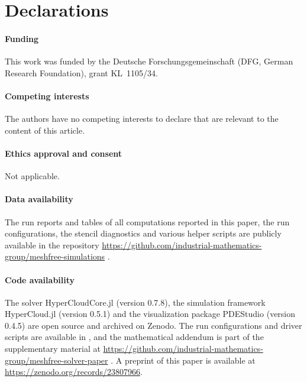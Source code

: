 \documentclass[smallextended]{svjour3}
\numberwithin{equation}{section}
\begin{document}
\section*{Declarations}

\paragraph{Funding}
This work was funded by the Deutsche Forschungsgemeinschaft (DFG, German Research Foundation), grant KL~1105/34.

\paragraph{Competing interests}
The authors have no competing interests to declare that are relevant to the content of this article.

\paragraph{Ethics approval and consent}
Not applicable.

\paragraph{Data availability}
\begin{sloppypar}%
The run reports and tables of all computations reported in this paper, the run configurations, the stencil diagnostics and various helper scripts are publicly available in the repository \url{https://github.com/industrial-mathematics-group/meshfree-simulations} \cite{jung_meshfree_simulations}.
\end{sloppypar}

\paragraph{Code availability}
The solver HyperCloudCore.jl \cite{jung_hypercloudcore} (version 0.7.8), the simulation framework HyperCloud.jl \cite{jung_hypercloud} (version 0.5.1) and the visualization package PDEStudio \cite{jung_pdestudio} (version 0.4.5) are open source and archived on Zenodo. The run configurations and driver scripts are available in \cite{jung_meshfree_simulations}, and the mathematical addendum \cite{JungAddendum2026} is part of the supplementary material at \url{https://github.com/industrial-mathematics-group/meshfree-solver-paper} \cite{jung_supplementary}. A preprint of this paper is available at \url{https://zenodo.org/records/23807966}.
\end{document}
